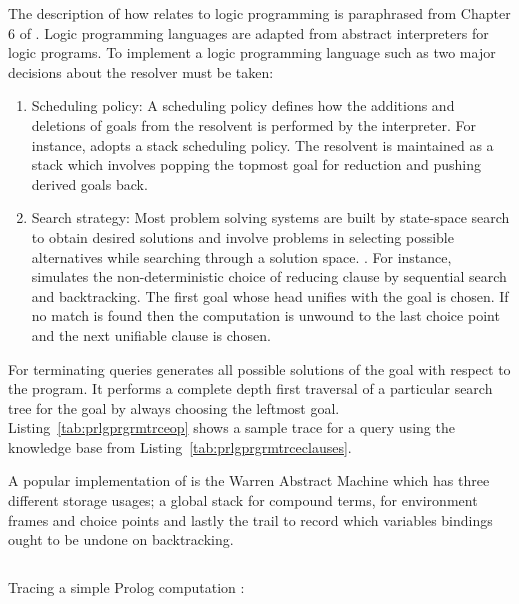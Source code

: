 \documentclass[thesis-solanki.tex]{subfiles}
\begin{document}
The description of how  relates to logic programming is paraphrased from Chapter 6 of
\cite{Sterling:1994:APA:175753}.
Logic programming languages are adapted from abstract interpreters for logic programs.
To implement a logic programming language such as  two major decisions about the resolver must be
taken:
\begin{enumerate}
\item Scheduling policy:
  A scheduling policy defines how the additions and deletions of goals from the resolvent is performed by the interpreter.
  For instance,  adopts a 
  stack scheduling policy. The resolvent is maintained as a stack which involves popping the topmost goal for reduction and pushing derived goals back.

\item Search strategy:
  Most problem solving systems are built by state-space 
  search to obtain desired solutions and involve problems in 
  selecting possible alternatives while searching through a
  solution space. 
  \cite{ohwada1987managing}.
  For instance,  simulates the 
  non-deterministic choice of reducing clause by sequential 
  search and backtracking.
  The first goal whose head unifies with the goal is chosen.
  If no match is found then the computation is unwound to 
  the last choice point and the next unifiable clause is
  chosen.
\end{enumerate}

For terminating queries  generates all possible solutions of the goal with respect to the
 program.
It performs a complete depth first traversal of a particular search tree for the goal by always choosing the
leftmost goal.
Listing~\ref{tab:prlgprgrmtrceop} shows a sample trace for a query using the knowledge base from Listing~\ref{tab:prlgprgrmtrceclauses}.

A popular implementation of  is the Warren Abstract Machine \cite{ait1999warren} which has three
different storage usages; a global stack for compound terms, for environment frames and choice points and lastly
the trail to record which variables bindings ought to be undone on backtracking.

\begin{code-list}[H]
  \begin{singlespace}
    \inputminted[linenos, lastline=6]{prolog}{prologprogramtrace.pl}
  \end{singlespace}
  \caption{Tracing a simple Prolog computation \cite{Sterling:1994:APA:175753} : }
\label{tab:prlgprgrmtrceclauses}
\end{code-list}
\end{document}
